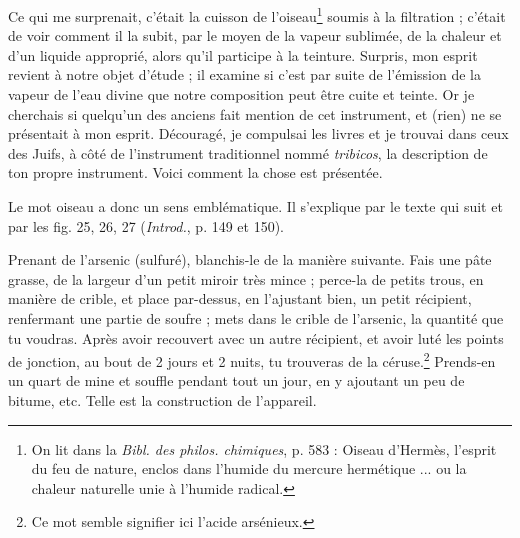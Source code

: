 \documentclass[landscape, a4paper, 11pt, oneside, polutonikogreek, french]{article}
\begin{document}
Ce qui me surprenait, c'était la cuisson de l'oiseau\footnote{On lit dans la \emph{Bibl. des philos. chimiques}, p. 583 : Oiseau d'Hermès, l'esprit du feu de nature, enclos dans l'humide du mercure hermétique ... ou la chaleur naturelle unie à l'humide radical.  } soumis à la filtration ; c'était de voir comment il la subit, par le moyen de la vapeur sublimée, de la chaleur et d'un liquide approprié, alors qu'il participe à la teinture. Surpris, mon esprit revient à notre objet d'étude ; il examine si c'est par suite de l'émission de la vapeur de l'eau divine que notre composition peut être cuite et teinte. Or je cherchais si quelqu'un des anciens fait mention de cet instrument, et (rien) ne se présentait à mon esprit. Découragé, je compulsai les livres et je trouvai dans ceux des Juifs, à côté de l'instrument traditionnel nommé \emph{tribicos}, la description de ton propre instrument. Voici comment la chose est présentée.

Le mot oiseau a donc un sens emblématique. Il s'explique par le texte qui suit et par les fig. 25, 26, 27 (\emph{Introd.}, p. 149 et 150).

Prenant de l'arsenic (sulfuré), blanchis-le de la manière suivante. Fais une pâte grasse, de la largeur d'un petit miroir très mince ; perce-la de petits trous, en manière de crible, et place par-dessus, en l'ajustant bien, un petit récipient, renfermant une partie de soufre ; mets dans le crible de l'arsenic, la quantité que tu voudras. Après avoir recouvert avec un autre récipient, et avoir luté les points de jonction, au bout de 2 jours et 2 nuits, tu trouveras de la céruse.\footnote{Ce mot semble signifier ici l'acide arsénieux.} Prends-en un quart de mine et souffle pendant tout un jour, en y ajoutant un peu de bitume, etc. Telle est la construction de l'appareil.
\end{document}
